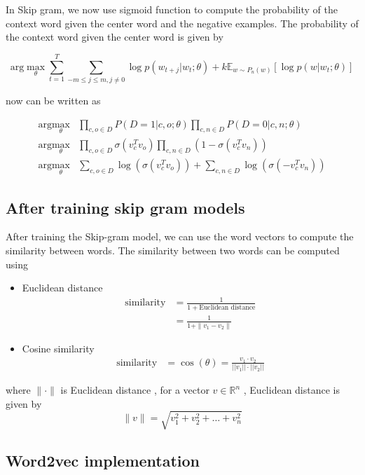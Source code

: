 In Skip gram, we now use sigmoid function to compute the probability of the context word given the center word and the negative examples. The probability of the context word given the center word is given by

$$\text{arg}\max_{\theta} \sum_{t=1}^{T} \sum_{-m \leq j \leq m, j \neq 0} \log p(w_{t+j} | w_t; \theta) + k \mathbb{E}_{w \sim P_n(w)} \left[ \log p(w | w_t; \theta) \right]$$ 

now can be written as

\begin{align*}
    \text{arg}\max_{\theta} & \prod_{c,o \in D} P(D = 1 | c, o; \theta) \prod_{c,n \in D} P(D = 0 | c, n; \theta) \\
    \text{arg}\max_{\theta} & \prod_{c,o \in D} \sigma(v_c^T v_o) \prod_{c,n \in D} (1- \sigma(v_c^T v_n)) \\
    \text{arg}\max_{\theta} & \sum_{c,o \in D} \log(\sigma(v_c^T v_o))  + \sum_{c,n \in D} \log(\sigma(-v_c^T v_n))
\end{align*}

\subsection{After training skip gram models}

After training the Skip-gram model, we can use the word vectors to compute the similarity between words. 
The similarity between two words can be computed using 
\begin{itemize}
    \item Euclidean distance
        \begin{align*}
            \text{similarity} &= \frac{1}{1 + \text{Euclidean distance}}\\
            &= \frac{1}{1 + \|v_1 - v_2\|}
        \end{align*}
    \item Cosine similarity
        \begin{align*}
            \text{similarity} &= \cos(\theta) = \frac{v_1 \cdot v_2}{||v_1|| \cdot ||v_2||}
        \end{align*}
\end{itemize}
where $\|\cdot\|$ is Euclidean distance , for a vector $v \in \mathbb{R}^n$ , Euclidean distance is given by 
$$  
    \|v\| = \sqrt{v_1^2 + v_2^2 + \ldots + v_n^2} 
$$

\subsection{Word2vec implementation}

